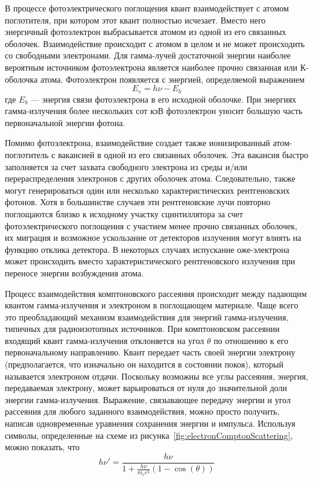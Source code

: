 В процессе фотоэлектрического поглощения квант взаимодействует с атомом поглотителя, при котором этот квант полностью исчезает. Вместо него энергичный фотоэлектрон выбрасывается атомом из одной из его связанных оболочек. Взаимодействие происходит с атомом в целом и не может происходить со свободными электронами. Для гамма-лучей достаточной энергии наиболее вероятным источником фотоэлектрона является наиболее прочно связанная или К-оболочка атома. Фотоэлектрон появляется с энергией, определяемой выражением
\begin{equation*}
  E_e = h \nu - E_b
\end{equation*}
где $E_b$ --- энергия связи фотоэлектрона в его исходной оболочке. При энергиях гамма-излучения более нескольких сот кэВ фотоэлектрон уносит большую часть первоначальной энергии фотона. 

Помимо фотоэлектрона, взаимодействие создает также ионизированный атом-поглотитель с вакансией в одной из его связанных оболочек. Эта вакансия быстро заполняется за счет захвата свободного электрона из среды и/или перераспределения электронов с других оболочек атома. Следовательно, также могут генерироваться один или несколько характеристических рентгеновских фотонов. Хотя в большинстве случаев эти рентгеновские лучи повторно поглощаются близко к исходному участку сцинтиллятора за счет фотоэлектрического поглощения с участием менее прочно связанных оболочек, их миграция и возможное ускользание от детекторов излучения могут влиять на функцию отклика детектора. В некоторых случаях испускание оже-электрона может происходить вместо характеристического рентгеновского излучения при переносе энергии возбуждения атома.~\cite{Knoll2010}

Процесс взаимодействия комптоновского рассеяния происходит между падающим квантом гамма-излучения и электроном в поглощающем материале. Чаще всего это преобладающий механизм взаимодействия для энергий гамма-излучения, типичных для радиоизотопных источников. При комптоновском рассеянии входящий квант гамма-излучения отклоняется на угол $\theta$ по отношению к его первоначальному направлению. Квант передает часть своей энергии электрону (предполагается, что изначально он находится в состоянии покоя), который называется электроном отдачи. Поскольку возможны все углы рассеяния, энергия, передаваемая электрону, может варьироваться от нуля до значительной доли энергии гамма-излучения. Выражение, связывающее передачу энергии и угол рассеяния для любого заданного взаимодействия, можно просто получить, написав одновременные уравнения сохранения энергии и импульса. Используя символы, определенные на схеме из рисунка~\ref{fig:electronComptonScattering}, можно показать, что
\begin{equation*}
  h \nu' = \frac{ h \nu }{ 1 + \frac{h \nu }{ m_e c^2  } ( 1 - \cos(\theta) ) }
\end{equation*}


